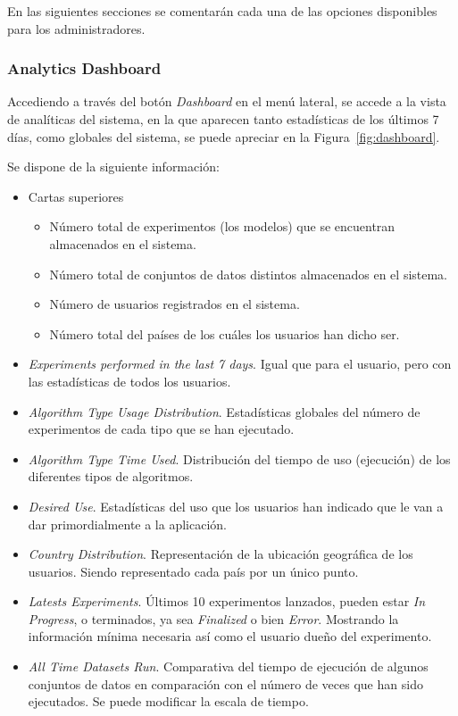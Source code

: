 
En las siguientes secciones se comentarán cada una de las opciones disponibles para los administradores.

\subsubsection{Analytics Dashboard}
Accediendo a través del botón \textit{Dashboard} en el menú lateral, se accede a la vista de analíticas del sistema, en la que aparecen tanto estadísticas de los últimos 7 días, como globales del sistema, se puede apreciar en la Figura~\ref{fig:dashboard}.


Se dispone de la siguiente información:
\begin{itemize}
\item Cartas superiores
\begin{itemize}
	\item Número total de experimentos (los modelos) que se encuentran almacenados en el sistema.
	\item Número total de conjuntos de datos distintos almacenados en el sistema.
	\item Número de usuarios registrados en el sistema.
	\item Número total del países de los cuáles los usuarios han dicho ser.
\end{itemize}
\item \textit{Experiments performed in the last 7 days}. Igual que para el usuario, pero con las estadísticas de todos los usuarios. 
\item \textit{Algorithm Type Usage Distribution}. Estadísticas globales del número de experimentos de cada tipo que se han ejecutado.
\item \textit{Algorithm Type Time Used}. Distribución del tiempo de uso (ejecución) de los diferentes tipos de algoritmos.
\item \textit{Desired Use}. Estadísticas del uso que los usuarios han indicado que le van a dar primordialmente a la aplicación.
\item \textit{Country Distribution}. Representación de la ubicación geográfica de los usuarios. Siendo representado cada país por un único punto.
\item \textit{Latests Experiments}. Últimos 10 experimentos lanzados, pueden estar \textit{In Progress}, o terminados, ya sea \textit{Finalized} o bien \textit{Error}. Mostrando la información mínima necesaria así como el usuario dueño del experimento.
\item \textit{All Time Datasets Run}. Comparativa del tiempo de ejecución de algunos conjuntos de datos en comparación con el número de veces que han sido ejecutados. Se puede modificar la escala de tiempo.
\end{itemize}

